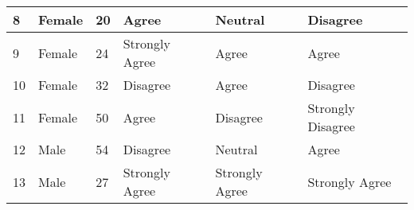 \begin{appendices}
\begin{table}[]
\begin{tabular}{|l|l|l|l|l|l|}
		8                       & Female          & 20           & Agree                                                             & Neutral                           & Disagree                                  \\ \hline
		9                       & Female          & 24           & Strongly Agree                                                    & Agree                             & Agree                                     \\ \hline
		10                      & Female          & 32           & Disagree                                                          & Agree                             & Disagree                                  \\ \hline
		11                      & Female          & 50           & Agree                                                             & Disagree                          & Strongly Disagree                         \\ \hline
		12                      & Male            & 54           & Disagree                                                          & Neutral                           & Agree                                     \\ \hline
		13                      & Male            & 27           & Strongly Agree                                                    & Strongly Agree                    & Strongly Agree                            \\ \hline
	\end{tabular}
\end{table}	



\end{appendices}
